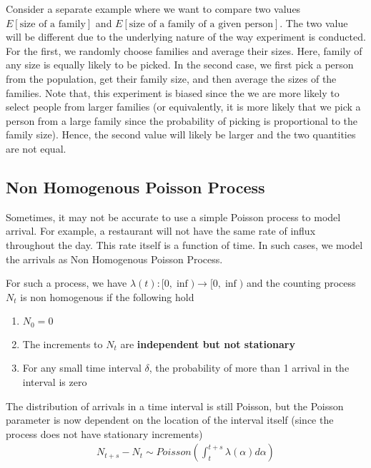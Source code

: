 \documentclass[../../probability-notes.tex]{subfiles}
\begin{document}
    Consider a separate example where we want to compare two values $E[\text{size of a family}]$ and $E[\text{size of a family of a given person}]$.\newline
    The two value will be different due to the underlying nature of the way experiment is conducted. For the first, we randomly choose families and average their sizes. Here, family of any size is equally likely to be picked. In the second case, we first pick a person from the population, get their family size, and then average the sizes of the families. Note that, this experiment is biased since the we are more likely to select people from larger families (or equivalently, it is more likely that we pick a person from a large family since the probability of picking is proportional to the family size). Hence, the second value will likely be larger and the two quantities are not equal.


    \subsection{Non Homogenous Poisson Process}
    Sometimes, it may not be accurate to use a simple Poisson process to model arrival. For example, a restaurant will not have the same rate of influx throughout the day. This rate itself is a function of time. In such cases, we model the arrivals as Non Homogenous Poisson Process.\newline

    For such a process, we have $\lambda(t): [0,\inf) \to [0, \inf)$ and the counting process $N_{t}$ is non homogenous if the following hold
    \begin{enumerate}
        \item $N_{0} = 0$
        \item The increments to $N_{t}$ are \textbf{independent but not stationary}
        \item For any small time interval $\delta$, the probability of more than 1 arrival in the interval is zero
    \end{enumerate}

    The distribution of arrivals in a time interval is still Poisson, but the Poisson parameter is now dependent on the location of the interval itself (since the process does not have stationary increments)
    \begin{align*}
        N_{t+s} - N_{t} \sim Poisson(\int_{t}^{t+s} \lambda(\alpha) d\alpha)
    \end{align*}
\end{document}
